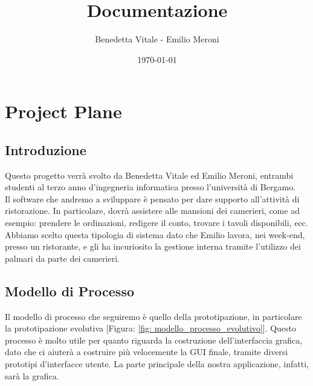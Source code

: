 \documentclass[12pt, letterpaper]{book}
\title{Documentazione}
\author{Benedetta Vitale - Emilio Meroni}
\date{\today}
\begin{document}
\maketitle

\tableofcontents    

\chapter{Project Plane}

\section{Introduzione}

    Questo progetto verrà svolto da Benedetta Vitale ed Emilio Meroni, entrambi studenti al terzo anno d'ingegneria informatica presso l'università di Bergamo.\\

    Il software che andremo a sviluppare è pensato per dare supporto 
    all'attività di ristorazione. In particolare, dovrà assistere alle mansioni dei camerieri, come ad esempio: prendere le ordinazioni, redigere il conto, trovare i tavoli disponibili, ecc.\\

    Abbiamo scelto questa tipologia di sistema dato che Emilio lavora, nei week-end, presso un ristorante, e gli ha incuriosito la gestione interna tramite l'utilizzo dei palmari da parte dei camerieri. 
    \begin{tabbing}
    
    \end{tabbing}
    
\section{Modello di Processo}

    Il modello di processo che seguiremo è quello della prototipazione, in particolare la prototipazione evolutiva [Figura: \ref{fig: modello_processo_evolutivo}]. Questo processo è molto utile per quanto riguarda la costruzione dell'interfaccia grafica, dato che ci aiuterà a costruire più velocemente la GUI finale, tramite diversi prototipi d'interfacce utente. La parte principale della nostra applicazione, infatti, sarà la grafica.
\end{document}
